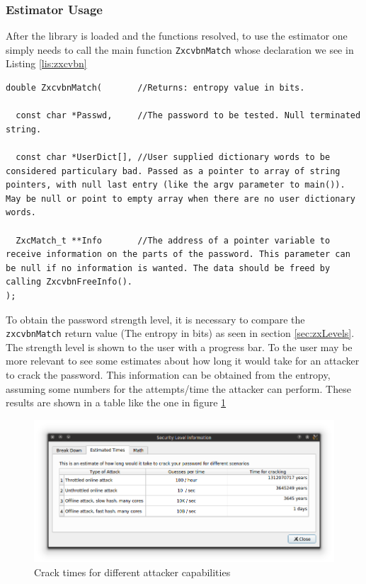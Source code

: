 \subsubsection*{Estimator Usage}

After the library is loaded and the functions resolved, to use the estimator one simply needs to call the main function \texttt{ZxcvbnMatch} whose declaration we see in Listing \ref{lis:zxcvbn} 

\begin{lstlisting}[style=customc, float=htb, caption={ZxcvbnMatch function declaration}, label = {lis:zxcvbn}]
double ZxcvbnMatch(       //Returns: entropy value in bits.
 
  const char *Passwd,     //The password to be tested. Null terminated string. 
  
  const char *UserDict[], //User supplied dictionary words to be considered particulary bad. Passed as a pointer to array of string pointers, with null last entry (like the argv parameter to main()). May be null or point to empty array when there are no user dictionary words. 
  
  ZxcMatch_t **Info       //The address of a pointer variable to receive information on the parts of the password. This parameter can be null if no information is wanted. The data should be freed by calling ZxcvbnFreeInfo().
);
\end{lstlisting}

To obtain the password strength level, it is necessary to compare the \texttt{zxcvbnMatch} return value (The entropy in bits) as seen in section \ref{sec:zxLevels}. The strength level is shown to the user with a progress bar.
To the user may be more relevant to see some estimates about how long it would take for an attacker to crack the password. This information can be obtained from the entropy, assuming some numbers for the attempts/time the attacker can perform. These results are shown in a table like the one in figure \ref{fig:zxcvbnTimes}
\begin{figure}[htb]
  \centering
  \captionsetup{justification=centering}
  \includegraphics[width=1\columnwidth]{chapters/figures/development/zxcvbnTimes}
  \caption{Crack times for different attacker capabilities}
  \label{fig:zxcvbnTimes}
\end{figure}


